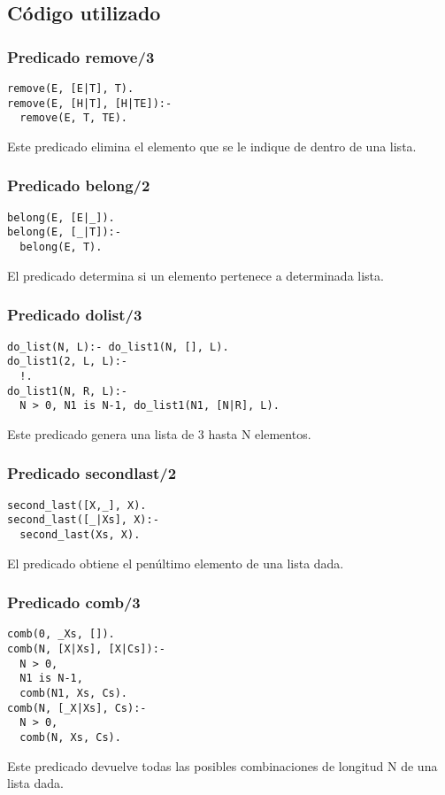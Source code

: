 \documentclass[11pt, a4paper]{article}
\begin{document}
\subsection{Código utilizado}
\subsubsection{Predicado remove/3}
\begin{lstlisting}[frame=single]
remove(E, [E|T], T).
remove(E, [H|T], [H|TE]):-
  remove(E, T, TE).
\end{lstlisting}
Este predicado elimina el elemento que se le indique de dentro de una lista.
\subsubsection{Predicado belong/2}
\begin{lstlisting}[frame=single]
belong(E, [E|_]).
belong(E, [_|T]):-
  belong(E, T).
\end{lstlisting}
El predicado determina si un elemento pertenece a determinada lista.
\subsubsection{Predicado dolist/3}
\begin{lstlisting}[frame=single]
do_list(N, L):- do_list1(N, [], L).
do_list1(2, L, L):-
  !.
do_list1(N, R, L):-
  N > 0, N1 is N-1, do_list1(N1, [N|R], L).
\end{lstlisting}
Este predicado genera una lista de 3 hasta N elementos.
\subsubsection{Predicado secondlast/2}
\begin{lstlisting}[frame=single]
second_last([X,_], X).
second_last([_|Xs], X):-
  second_last(Xs, X).
\end{lstlisting}
El predicado obtiene el penúltimo elemento de una lista dada.
\subsubsection{Predicado comb/3}
\begin{lstlisting}[frame=single]
comb(0, _Xs, []).
comb(N, [X|Xs], [X|Cs]):-
  N > 0,
  N1 is N-1,
  comb(N1, Xs, Cs).
comb(N, [_X|Xs], Cs):-
  N > 0,
  comb(N, Xs, Cs).
\end{lstlisting}
Este predicado devuelve todas las posibles combinaciones de longitud N de una lista dada.
\end{document}

